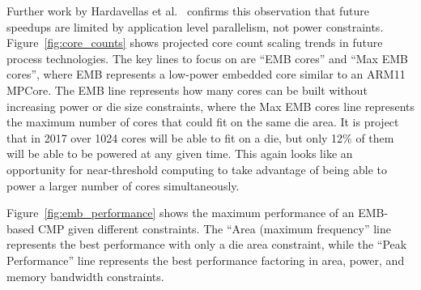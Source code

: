 Further work by Hardavellas et al.~\cite{Hardavellas:2011de} confirms this
observation that future speedups are limited by application level parallelism,
not power constraints. Figure~\ref{fig:core_counts} shows projected core count
scaling trends in future process technologies. The key lines to focus on are
``EMB cores'' and ``Max EMB cores'', where EMB represents a low-power embedded
core similar to an ARM11 MPCore. The EMB line represents how many cores can be
built without increasing power or die size constraints, where the Max EMB cores
line represents the maximum number of cores that could fit on the same die
area. It is project that in 2017 over 1024 cores will be able to fit on a die,
but only 12\% of them will be able to be powered at any given time. This again
looks like an opportunity for near-threshold computing to take advantage of
being able to power a larger number of cores simultaneously.

Figure~\ref{fig:emb_performance} shows the maximum performance of an EMB-based
CMP given different constraints. The ``Area (maximum frequency'' line
represents the best performance with only a die area constraint, while the
``Peak Performance'' line represents the best performance factoring in area,
power, and memory bandwidth constraints.

